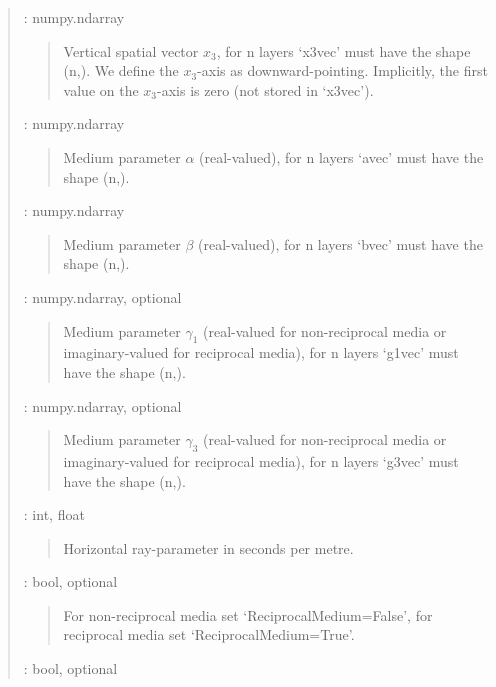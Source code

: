 \documentclass[letterpaper,10pt,english]{sphinxmanual}
\begin{document}
\begin{fulllineitems}
\begin{quote}
\begin{description}
 : numpy.ndarray
\begin{quote}

Vertical spatial vector \(x_3\), for n layers ‘x3vec’ must have the shape (n,). We define the \(x_3\)-axis as downward-pointing. Implicitly, the first value on the \(x_3\)-axis is zero (not stored in ‘x3vec’).
\end{quote}

 : numpy.ndarray
\begin{quote}

Medium parameter \(\alpha\) (real-valued), for n layers ‘avec’ must have the shape (n,).
\end{quote}

 : numpy.ndarray
\begin{quote}

Medium parameter \(\beta\) (real-valued), for n layers ‘bvec’ must have the shape (n,).
\end{quote}

 : numpy.ndarray, optional
\begin{quote}

Medium parameter \(\gamma_1\) (real-valued for non-reciprocal media or imaginary-valued for reciprocal media), for n layers ‘g1vec’ must have the shape (n,).
\end{quote}

 : numpy.ndarray, optional
\begin{quote}

Medium parameter \(\gamma_3\) (real-valued for non-reciprocal media or imaginary-valued for reciprocal media), for n layers ‘g3vec’ must have the shape (n,).
\end{quote}

 : int, float
\begin{quote}

Horizontal ray-parameter in seconds per metre.
\end{quote}

 : bool, optional
\begin{quote}

For non-reciprocal media set ‘ReciprocalMedium=False’, for reciprocal media set ‘ReciprocalMedium=True’.
\end{quote}

 : bool, optional
\begin{quote}


\end{quote}
\end{description}
\end{quote}
\end{fulllineitems}
\end{document}
